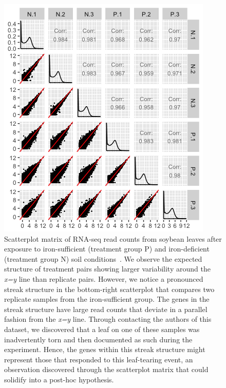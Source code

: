 \documentclass[11pt,a4paper,oldfontcommands,openany]{memoir}
\numberwithin{equation}{section} %
\begin{document}
\begin{figure}[!tpb]
\begin{framed}
\centerline{\includegraphics[width=\columnwidth]{MakeFigures/sbIRStreak.jpg}}
\end{framed}
\caption{Scatterplot matrix of RNA-seq read counts from soybean leaves after exposure to iron-sufficient (treatment group P) and iron-deficient (treatment group N) soil conditions~\citep{Lauter16}. We observe the expected structure of treatment pairs showing larger variability around the \textit{x=y} line than replicate pairs. However, we notice a pronounced streak structure in the bottom-right scatterplot that compares two replicate samples from the iron-sufficient group. The genes in the streak structure have large read counts that deviate in a parallel fashion from the \textit{x=y} line. Through contacting the authors of this dataset, we discovered that a leaf on one of these samples was inadvertently torn and then documented as such during the experiment. Hence, the genes within this streak structure might represent those that responded to this leaf-tearing event, an observation discovered through the scatterplot matrix that could solidify into a post-hoc hypothesis.
\label{structure}}
\end{figure}
\end{document}
